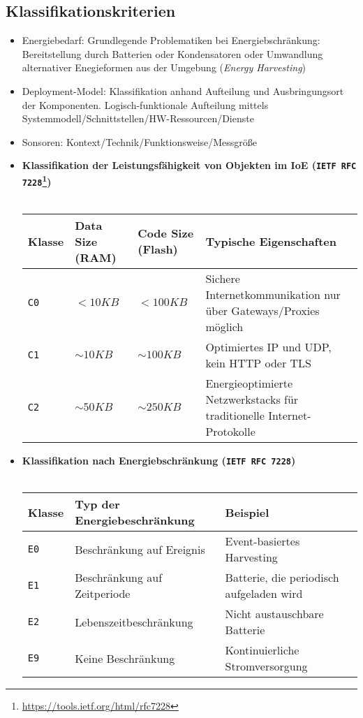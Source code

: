 \subsection{Klassifikationskriterien}
\begin{itemize}
	\item Energiebedarf: Grundlegende Problematiken bei Energiebschränkung: Bereitstellung durch Batterien oder Kondensatoren oder Umwandlung alternativer Enegieformen aus der Umgebung (\textit{Energy Harvesting})
	\item Deployment-Model: Klassifikation anhand Aufteilung und Ausbringungsort der Komponenten. Logisch-funktionale Aufteilung mittels Systemmodell/Schnittstellen/HW-Ressourcen/Dienste
	\item Sonsoren: Kontext/Technik/Funktionsweise/Messgröße
	\item \textbf{Klassifikation der Leistungsfähigkeit von Objekten im IoE (\texttt{IETF RFC 7228}\footnote{\url{https://tools.ietf.org/html/rfc7228}})}\\\\
	\begin{tabularx}{\linewidth}{l|l|l|X}
		\textbf{Klasse} & \textbf{Data Size (RAM)} & \textbf{Code Size (Flash)} & \textbf{Typische Eigenschaften} \\
		\hline
		\texttt{C0} & \(< 10 KB\) & \(< 100 KB\) & Sichere Internetkommunikation nur über Gateways/Proxies möglich \\
		\hline
		\texttt{C1} & \(\sim 10 KB\) & \(\sim 100 KB\) & Optimiertes IP und UDP, kein HTTP oder TLS \\
		\hline
		\texttt{C2} & \(\sim 50 KB\) & \(\sim 250 KB\) & Energieoptimierte Netzwerkstacks für traditionelle Internet-Protokolle \\
	\end{tabularx}
	\item \textbf{Klassifikation nach Energiebschränkung (\texttt{IETF RFC 7228})}\\\\
	\begin{tabularx}{\linewidth}{l|l|X}
		\textbf{Klasse} & \textbf{Typ der Energiebeschränkung} & \textbf{Beispiel}\\
		\hline
		\texttt{E0} & Beschränkung auf Ereignis & Event-basiertes Harvesting \\
		\hline
		\texttt{E1} & Beschränkung auf Zeitperiode & Batterie, die periodisch aufgeladen wird \\
		\hline
		\texttt{E2} & Lebenszeitbeschränkung & Nicht austauschbare Batterie \\
		\hline
		\texttt{E9} & Keine Beschränkung & Kontinuierliche Stromversorgung \\
	\end{tabularx}
\end{itemize}


